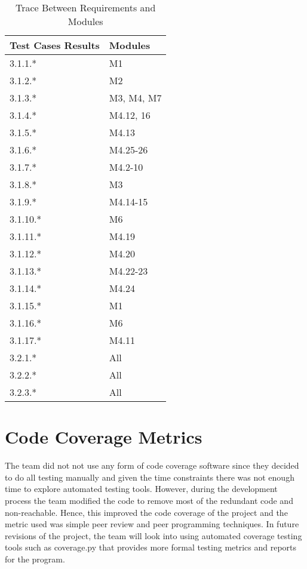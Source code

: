 \documentclass[12pt, titlepage]{article}
\begin{document}
\begin{table}[H]
\centering
\begin{tabular}{p{}| p{}}
\toprule
\textbf{Test Cases Results} & \textbf{Modules}\\
\midrule
3.1.1.* & M1\\
3.1.2.* & M2\\
3.1.3.* & M3, M4, M7\\
3.1.4.* & M4.12, 16\\
3.1.5.* & M4.13\\
3.1.6.* & M4.25-26\\
3.1.7.* & M4.2-10\\
3.1.8.* & M3\\
3.1.9.* & M4.14-15\\
3.1.10.* & M6\\
3.1.11.* & M4.19\\
3.1.12.* & M4.20\\
3.1.13.* & M4.22-23\\
3.1.14.* & M4.24\\
3.1.15.* & M1\\
3.1.16.* & M6\\
3.1.17.* & M4.11\\
3.2.1.* & All\\
3.2.2.* & All\\
3.2.3.* & All\\
\bottomrule
\end{tabular}
\caption{Trace Between Requirements and Modules}
\label{TblRT}
\end{table}

\section{Code Coverage Metrics}
The team did not not use any form of code coverage software since they decided to do all testing manually and given the time constraints there was not enough time to explore automated testing tools. However, during the development process the team modified the code to remove most of the redundant code and non-reachable. Hence, this improved the code coverage of the project and the metric used was simple peer review and peer programming techniques. In future revisions of the project, the team will look into using automated coverage testing tools such as coverage.py that provides more formal testing metrics and reports for the program. 




\end{document}
